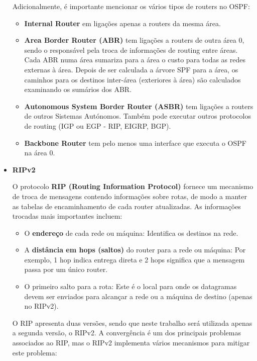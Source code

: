 \documentclass[11pt,english, openright, oneside]{book}
\begin{document}
\begin{itemize}
  \newpage
  Adicionalmente, é importante mencionar os vários tipos de routers no OSPF:
  \begin{itemize}
      \item \textbf{Internal Router} em ligações apenas a routers da mesma área.
      \item \textbf{Area Border Router (ABR)} tem ligações a routers de outra área 0, sendo o responsável pela troca de informações de routing entre áreas. Cada ABR numa área sumariza para a área o custo para todas as redes externas à área. Depois de ser calculada a árvore SPF 
      para a área, os caminhos para os destinos inter-área (exteriores à área) são calculados examinando os sumários dos ABR. 
      \item \textbf{Autonomous System Border Router (ASBR)} tem ligações a routers de outros Sistemas 
      Autónomos. Também pode executar outros protocolos de routing (IGP ou EGP - RIP, 
      EIGRP, BGP). 
      \item \textbf{Backbone Router} tem pelo menos uma interface que executa o OSPF na área 0.
    \end{itemize}
    \vspace{0.2cm}

  \item \textbf{RIPv2}
  \par O protocolo \textbf{RIP (Routing Information Protocol)} fornece um mecanismo de troca de mensagens contendo informações sobre rotas, de modo a manter as tabelas de encaminhamento de cada router atualizadas. As informações trocadas mais importantes incluem:
  \begin{itemize}
      \item O \textbf{endereço} de cada rede ou máquina: Identifica os destinos na rede.
      \item A \textbf{distância em hops (saltos)} do router para a rede ou máquina: Por exemplo, 1 hop indica entrega direta e 2 hops significa que a mensagem passa por um único router.
      \item O primeiro salto para a rota: Este é o local para onde os datagramas devem ser enviados para alcançar a rede ou a máquina de destino (apenas no RIPv2).
    \end{itemize}
    \vspace{0.2cm}

    O RIP apresenta duas versões, sendo que neste trabalho será utilizada apenas a segunda versão, o RIPv2. A convergência é um dos principais problemas associados ao RIP, mas o RIPv2 implementa vários mecanismos para mitigar este problema:


\end{itemize}
\end{document}
